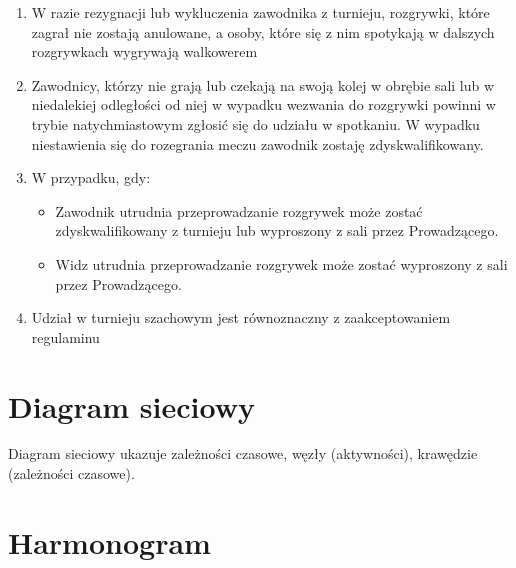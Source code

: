 \begin{enumerate}
	\item W razie rezygnacji lub wykluczenia zawodnika z turnieju, rozgrywki, które zagrał nie zostają anulowane, a osoby, które się z nim spotykają w dalszych rozgrywkach wygrywają walkowerem 
	\item Zawodnicy, którzy nie grają lub czekają na swoją kolej w obrębie sali lub w niedalekiej odległości od niej w wypadku wezwania do rozgrywki powinni w trybie natychmiastowym zgłosić się do udziału w spotkaniu. W wypadku niestawienia się do rozegrania meczu zawodnik zostaję zdyskwalifikowany.
	\item W przypadku, gdy:
\begin{itemize}
	\item Zawodnik utrudnia przeprowadzanie rozgrywek może zostać zdyskwalifikowany z turnieju lub wyproszony z sali przez Prowadzącego.
	\item Widz utrudnia przeprowadzanie rozgrywek może zostać wyproszony z sali przez Prowadzącego.
\end{itemize}
\item Udział w turnieju szachowym jest równoznaczny z zaakceptowaniem regulaminu
\end{enumerate}
\section{Diagram sieciowy}
Diagram sieciowy ukazuje zależności czasowe, węzły (aktywności), krawędzie (zależności czasowe).


\section{Harmonogram}
